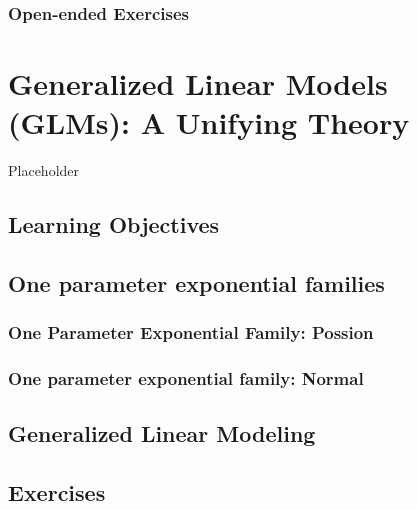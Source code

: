 \documentclass[
]{krantz}
\begin{document}
\hypertarget{open-ended-exercises-1}{%
\subsection{Open-ended Exercises}\label{open-ended-exercises-1}}

\hypertarget{ch-glms}{%
\chapter{Generalized Linear Models (GLMs): A Unifying Theory}\label{ch-glms}}

Placeholder

\hypertarget{learning-objectives-4}{%
\section{Learning Objectives}\label{learning-objectives-4}}

\hypertarget{one-parameter-exponential-families}{%
\section{One parameter exponential families}\label{one-parameter-exponential-families}}

\hypertarget{one-parameter-exponential-family-possion}{%
\subsection{One Parameter Exponential Family: Possion}\label{one-parameter-exponential-family-possion}}

\hypertarget{one-parameter-exponential-family-normal}{%
\subsection{One parameter exponential family: Normal}\label{one-parameter-exponential-family-normal}}

\hypertarget{generalized-linear-modeling}{%
\section{Generalized Linear Modeling}\label{generalized-linear-modeling}}

\hypertarget{exercises-4}{%
\section{Exercises}\label{exercises-4}}
\end{document}
